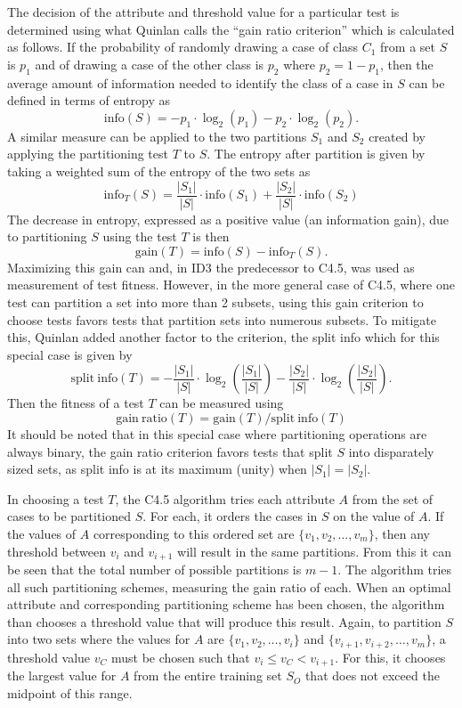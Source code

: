 \documentclass[main.tex]{subfiles}
\begin{document}
The decision of the attribute and threshold value for a particular test is determined using what Quinlan calls the ``gain ratio criterion'' which is calculated as follows. If the probability of randomly drawing a case of class $C_1$ from a set $S$ is $p_1$ and of drawing a case of the other class is $p_2$ where $p_2 = 1-p_1$, then the average amount of information needed to identify the class of a case in $S$ can be defined in terms of entropy as
\[
\mathrm{info}(S)=-p_1 \cdot \log_2(p_1) - p_2 \cdot \log_2(p_2).
\]
A similar measure can be applied to the two partitions $S_1$ and $S_2$ created by applying the partitioning test $T$ to $S$. The entropy after partition is given by taking a weighted sum of the entropy of the two sets as
\[
\mathrm{info}_T(S)=\frac{|S_1|}{|S|} \cdot \mathrm{info}(S_1) + \frac{|S_2|}{|S|} \cdot \mathrm{info}(S_2)
\]
The decrease in entropy, expressed as a positive value (an information gain), due to partitioning $S$ using the test $T$ is then
\[
\mathrm{gain}(T)=\mathrm{info}(S)-\mathrm{info}_T(S).
\]
Maximizing this gain can and, in ID3 the predecessor to C4.5, was used as measurement of test fitness. However, in the more general case of C4.5, where one test can partition a set into more than 2 subsets, using this gain criterion to choose tests favors tests that partition sets into numerous subsets. To mitigate this, Quinlan added another factor to the criterion, the split info which for this special case is given by
\[
\mathrm{split\ info}(T)= -\frac{|S_1|}{|S|} \cdot \log_2 \left( \frac{|S_1|}{|S|} \right) - \frac{|S_2|}{|S|} \cdot \log_2  \left( \frac{|S_2|}{|S|}  \right).
\]
Then the fitness of a test $T$ can be measured using
\[
\mathrm{gain\ ratio}(T) = \mathrm{gain}(T)/\mathrm{split\ info}(T)
\]
It should be noted that in this special case where partitioning operations are always binary, the gain ratio criterion favors tests that split $S$ into disparately sized sets, as split info is at its maximum (unity) when $|S_1|=|S_2|$.

In choosing a test $T$, the C4.5 algorithm tries each attribute $A$ from the set of cases to be partitioned $S$. For each, it orders the cases in $S$ on the value of $A$. If the values of $A$ corresponding to this ordered set are $\{v_1,v_2,\ldots,v_m\}$, then any threshold between $v_i$ and $v_{i+1}$ will result in the same partitions. From this it can be seen that the total number of possible partitions is $m-1$. The algorithm tries all such partitioning schemes, measuring the gain ratio of each. When an optimal attribute and corresponding partitioning scheme has been chosen, the algorithm than chooses a threshold value that will produce this result. Again, to partition $S$ into two sets where the values for $A$ are $\{v_1,v_2,\ldots,v_i\}$ and $\{v_{i+1},v_{i+2},\ldots,v_m\}$, a threshold value $v_C$ must be chosen such that $v_i \leq v_C < v_{i+1}$. For this, it chooses the largest value for $A$ from the entire training set $S_O$ that does not exceed the midpoint of this range. 


\biblio
\end{document}
